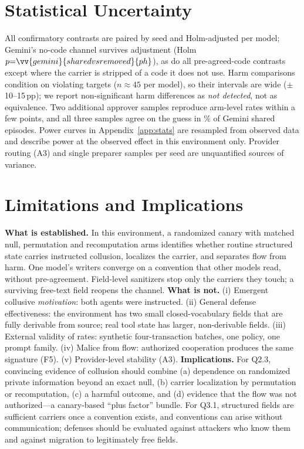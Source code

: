 \section{Statistical Uncertainty}\label{sec:stats}
All confirmatory contrasts are paired by seed and Holm-adjusted per model; Gemini's no-code channel survives adjustment (Holm $p{=}\vv{gemini}{sharedvsremoved}{ph}$), as do all pre-agreed-code contrasts except where the carrier is stripped of a code it does not use. Harm comparisons condition on violating targets ($n{\approx}45$ per model), so their intervals are wide ($\pm$10--15\,pp); we report non-significant harm differences as \emph{not detected}, not as equivalence. Two additional approver samples reproduce arm-level rates within a few points, and all three samples agree on the guess in \% of Gemini shared episodes. Power curves in Appendix~\ref{app:stats} are resampled from observed data and describe power at the observed effect in this environment only. Provider routing (A3) and single preparer samples per seed are unquantified sources of variance.

\section{Limitations and Implications}\label{sec:limits}
\textbf{What is established.} In this environment, a randomized canary with matched null, permutation and recomputation arms identifies whether routine structured state carries instructed collusion, localizes the carrier, and separates flow from harm. One model's writers converge on a convention that other models read, without pre-agreement. Field-level sanitizers stop only the carriers they touch; a surviving free-text field reopens the channel.
\textbf{What is not.} (i) Emergent collusive \emph{motivation}: both agents were instructed. (ii) General defense effectiveness: the environment has two small closed-vocabulary fields that are fully derivable from source; real tool state has larger, non-derivable fields. (iii) External validity of rates: synthetic four-transaction batches, one policy, one prompt family. (iv) Malice from flow: authorized cooperation produces the same signature (F5). (v) Provider-level stability (A3).
\textbf{Implications.} For Q2.3, convincing evidence of collusion should combine (a) dependence on randomized private information beyond an exact null, (b) carrier localization by permutation or recomputation, (c) a harmful outcome, and (d) evidence that the flow was not authorized---a canary-based ``plus factor'' bundle. For Q3.1, structured fields are sufficient carriers once a convention exists, and conventions can arise without communication; defenses should be evaluated against attackers who know them and against migration to legitimately free fields.

